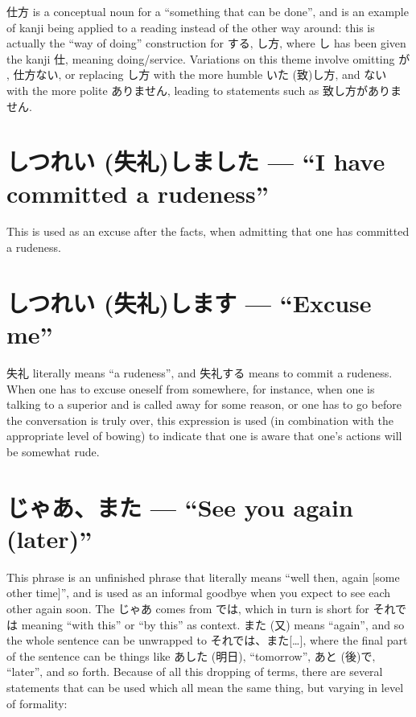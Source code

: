\documentclass[11pt, b5paper, twoside, openright, onecolumn]{book}
\makeatletter
\newcommand*{\rubystack}[2]{{\relscale{0.5}%
  \begin{tabular}[b]{@{}c@{}}%
    {#1}\\%
   {\textscale{2}{#2}}%
  \end{tabular}}%
}
\DeclareRobustCommand*{\ruby}[2]{%
  \mbox{%
    \setlength{\parskip}{0ex}%
    \BeginAccSupp{method=pdfstringdef,ActualText={#1}}%
      \rubystack{\phantom{#2}}{#1}%
      \llap{%
        \rubystack{#2}{\phantom{#1}}%
      }%
    \EndAccSupp{}%
  }%
}
\renewcommand*{\ruby}[2]{#2 (#1)}%
\makeatother
\begin{document}
仕方 is a conceptual noun for a “something that can be done”‚ and is an example of kanji being applied to a reading instead of the other way around: this is actually the “way of doing” construction for する‚ し方‚ where し has been given the kanji 仕‚ meaning doing/service. Variations on this theme involve omitting が‚ 仕方ない‚ or replacing し方 with the more humble \ruby{致}{いた}し方‚ and ない with the more polite ありません‚ leading to statements such as 致し方がありません.

\section*{\ruby{失礼}{しつれい}しました — “I have committed a rudeness”}

This is used as an excuse after the facts‚ when admitting that one has committed a rudeness.

\section*{\ruby{失礼}{しつれい}します — “Excuse me”}

失礼 literally means “a rudeness”‚ and 失礼する means to commit a rudeness. When one has to excuse oneself from somewhere‚ for instance‚ when one is talking to a superior and is called away for some reason‚ or one has to go before the conversation is truly over‚ this expression is used (in combination with the appropriate level of bowing) to indicate that one is aware that one’s actions will be somewhat rude.

\section*{じゃあ、また — “See you again (later)”}

This phrase is an unfinished phrase that literally means “well then‚ again [some other time]”‚ and is used as an informal goodbye when you expect to see each other again soon. The じゃあ comes from では‚ which in turn is short for それでは meaning “with this” or “by this” as context. また (又) means “again”‚ and so the whole sentence can be unwrapped to それでは、また[…]‚ where the final part of the sentence can be things like \ruby{明日}{あした}‚ “tomorrow”‚ \ruby{後}{あと}で‚ “later”‚ and so forth. Because of all this dropping of terms‚ there are several statements that can be used which all mean the same thing‚ but varying in level of formality:
\end{document}
